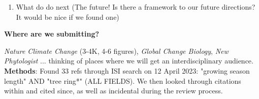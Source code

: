 \documentclass[11pt,letter]{article}
\begin{document}
\begin{enumerate}
\begin{enumerate} 
\item Overview paragraph of three reasons
\begin{enumerate} 
\item Measurement -- see box/figure  (include measurement only here or briefly so we move through it fast)
\item Resource limitation
\item Constraints
\end{enumerate}
\item Resource limitation, evidence for an against 
\begin{enumerate}
\item Nutrients
\item Water
\item Is this more species-specific?
\end{enumerate}
\item Constraints, evidence for an against 
\begin{enumerate}
\item Leaf life span
\item Budset stuff ... (Zohner, Sool.)
\item Evidence across species? Or which is species-specific
\end{enumerate}
\end{enumerate}
\item What do do next (The future! Is there a framework to our future directions? It would be nice if we found one) 
\end{enumerate}

{\bf Where are we submitting?}

\emph{Nature Climate Change} (3-4K, 4-6 figures), \emph{Global Change Biology}, \emph{New Phytologist} ... thinking of places where we will get an interdisciplinary audience.\\

{\bf Methods}: Found 33 refs through ISI search on 12 April 2023: "growing season length" AND "tree ring*" (ALL FIELDS). We then looked through citations within and cited since, as well as incidental during the review process.\\
\end{document}
